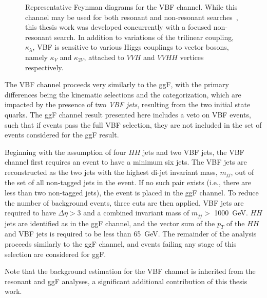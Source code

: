 \begin{figure}[ht]
\caption{\label{fig:VBF-diagrams} Representative Feynman diagrams for the VBF channel. While this channel may be 
used for both resonant and non-resonant searches~\cite{HDBS-2018-18}, this thesis work was developed concurrently 
with a focused non-resonant search. In addition to variations of the trilinear coupling, $\kappa_{\lambda}$, 
VBF is sensitive to various Higgs couplings to vector bosons, namely $\kappa_{V}$ and $\kappa_{2V}$, attached to 
$VVH$ and $VVHH$ vertices respectively.}
\end{figure} 

The VBF channel proceeds very similarly to the ggF, with the primary differences being the 
kinematic selections and the categorization, which are impacted by the 
presence of two \emph{VBF jets}, resulting from the two initial state quarks. The ggF channel 
result presented here includes a veto on VBF events, such that if events pass the full 
VBF selection, they are not included in the set of events considered for the ggF result.

Beginning with the assumption of four $HH$ jets and two VBF jets, the VBF channel first requires an 
event to have a minimum six jets. The VBF jets are reconstructed as the two jets with the 
highest di-jet invariant mass, $m_{jj}$, out of the set of all non-tagged jets in the event. If no such pair 
exists (i.e., there are less than two non-tagged jets), the event is placed in the ggF channel. 
To reduce the number of background events, three cuts are then applied, VBF jets are required to have 
$\Delta \eta > 3$ and a combined invariant mass of $m_{jj}>$ \SI{1000}{\GeV}. $HH$ jets are identified 
as in the ggF channel, and the vector sum of the $p_{T}$ of the $HH$ and VBF jets is required to be 
less than \SI{65}{\GeV}. The remainder of the analysis proceeds similarly to the ggF channel, and 
events failing any stage of this selection are considered for ggF.

Note that the background estimation for the VBF channel is inherited from the resonant 
and ggF analyses, a significant additional contribution of this thesis work.